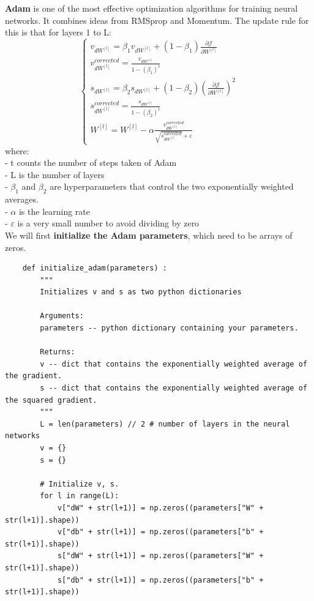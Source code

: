 \documentclass[11pt, a4paper]{article}
\begin{document}
\begin{spacing}{1.1}
	\noindent \textbf{Adam} is one of the most effective optimization algorithms for training neural networks. It combines ideas from RMSprop and Momentum. The update rule for this is that for layers 1 to L:
	$$\begin{cases}
	v_{dW^{[l]}} = \beta_1 v_{dW^{[l]}} + (1 - \beta_1) \frac{\partial \mathcal{J} }{ \partial W^{[l]} } \\
	v^{corrected}_{dW^{[l]}} = \frac{v_{dW^{[l]}}}{1 - (\beta_1)^t} \\
	s_{dW^{[l]}} = \beta_2 s_{dW^{[l]}} + (1 - \beta_2) (\frac{\partial \mathcal{J} }{\partial W^{[l]} })^2 \\
	s^{corrected}_{dW^{[l]}} = \frac{s_{dW^{[l]}}}{1 - (\beta_2)^t} \\
	W^{[l]} = W^{[l]} - \alpha \frac{v^{corrected}_{dW^{[l]}}}{\sqrt{s^{corrected}_{dW^{[l]}}} + \varepsilon}
	\end{cases}$$ where: \\
	\hspace*{2mm} - t counts the number of steps taken of Adam \\
	\hspace*{2mm} - L is the number of layers\\
	\hspace*{2mm} - $\beta_1$ and $\beta_2$ are hyperparameters that control the two exponentially weighted averages. \\
	\hspace*{2mm} - $\alpha$ is the learning rate\\
	\hspace*{2mm} - $\varepsilon$ is a very small number to avoid dividing by zero \vspace*{1mm} \\
	We will first \textbf{initialize the Adam parameters}, which need to be arrays of zeros.
	\begin{lstlisting}
	def initialize_adam(parameters) :
		"""
		Initializes v and s as two python dictionaries
		
		Arguments:
		parameters -- python dictionary containing your parameters.
		
		Returns: 
		v -- dict that contains the exponentially weighted average of the gradient.
		s -- dict that contains the exponentially weighted average of the squared gradient.
		"""
		L = len(parameters) // 2 # number of layers in the neural networks
		v = {}
		s = {}
		
		# Initialize v, s.
		for l in range(L):
			v["dW" + str(l+1)] = np.zeros((parameters["W" + str(l+1)].shape))
			v["db" + str(l+1)] = np.zeros((parameters["b" + str(l+1)].shape))
			s["dW" + str(l+1)] = np.zeros((parameters["W" + str(l+1)].shape))
			s["db" + str(l+1)] = np.zeros((parameters["b" + str(l+1)].shape))
		

\end{lstlisting}
\end{spacing}
\end{document}
